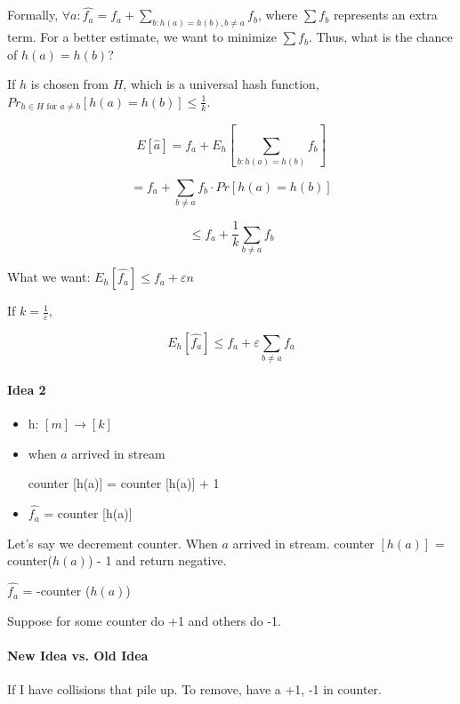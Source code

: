 \documentclass[11pt]{article}
\begin{document}
\smallskip

Formally, $\forall a: \hat{f_a} = f_a + \sum_{b: h(a) = h(b), b\neq a} f_b$, where $\sum f_b$ represents an extra term. For a better estimate, we want to minimize $\sum f_b$. Thus, what is the chance of $h(a) = h(b)$?

\smallskip

If $h$ is chosen from $H$, which is a universal hash function, $Pr_{h \in H \text{ for } a \neq b}[h(a) = h(b)] \leq \frac{1}{k}$. 

\smallskip

\[E[\hat{a}] = f_a + E_h[\sum_{b: h(a) = h(b)} f_b]\]

\[= f_a + \sum_{b \neq a} f_b \cdot Pr[h(a) = h(b)]\]

\[\leq f_a + \frac{1}{k} \sum_{b \neq a} f_b \]

What we want: $E_h[\hat{f_a}] \leq f_a + \varepsilon n$

\smallskip

If $k = \frac{1}{\varepsilon},$

\[E_h[\hat{f_a}] \leq f_a + \varepsilon \sum_{b \neq a} f_a\]

\paragraph{Idea 2}

\begin{itemize}

	\item h: $[m] \rightarrow [k]$
	
	\item when $a$ arrived in stream
		
		counter [h(a)] = counter [h(a)] + 1
	
	\item $\hat{f_a}$ = counter [h(a)]
	
\end{itemize}

Let's say we decrement counter. When $a$ arrived in stream. counter $[h(a)]$ = counter($h(a)$) - 1 and return negative.

\smallskip

$\hat{f_a}$ = -counter ($h(a)$)

\smallskip

Suppose for some counter do +1 and others do -1.

\paragraph{New Idea vs. Old Idea} If I have collisions that pile up. To remove, have a +1, -1 in counter.
\end{document}
